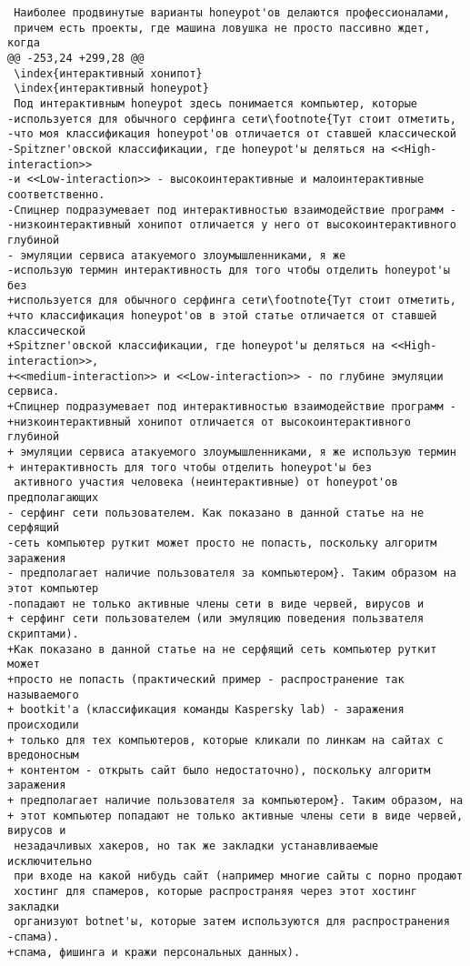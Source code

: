 \begin{verbatim}
 Наиболее продвинутые варианты honeypot'ов делаются профессионалами,
 причем есть проекты, где машина ловушка не просто пассивно ждет, когда
@@ -253,24 +299,28 @@
 \index{интерактивный хонипот}
 \index{интерактивный honeypot}
 Под интерактивным honeypot здесь понимается компьютер, которые
-используется для обычного серфинга сети\footnote{Тут стоит отметить,
-что моя классификация honeypot'ов отличается от ставшей классической
-Spitzner'овской классификации, где honeypot'ы деляться на <<High-interaction>>
-и <<Low-interaction>> - высокоинтерактивные и малоинтерактивные соответственно.
-Спицнер подразумевает под интерактивностью взаимодействие программ -
-низкоинтерактивный хонипот отличается у него от высокоинтерактивного глубиной
- эмуляции сервиса атакуемого злоумышленниками, я же
-использую термин интерактивность для того чтобы отделить honeypot'ы без
+используется для обычного серфинга сети\footnote{Тут стоит отметить,
+что классификация honeypot'ов в этой статье отличается от ставшей классической
+Spitzner'овской классификации, где honeypot'ы деляться на <<High-interaction>>,
+<<medium-interaction>> и <<Low-interaction>> - по глубине эмуляции сервиса.
+Спицнер подразумевает под интерактивностью взаимодействие программ -
+низкоинтерактивный хонипот отличается от высокоинтерактивного глубиной
+ эмуляции сервиса атакуемого злоумышленниками, я же использую термин
+ интерактивность для того чтобы отделить honeypot'ы без
 активного участия человека (неинтерактивные) от honeypot'ов предполагающих
- серфинг сети пользователем. Как показано в данной статье на не серфящий
-сеть компьютер руткит может просто не попасть, поскольку алгоритм заражения
- предполагает наличие пользователя за компьютером}. Таким образом на этот компьютер
-попадают не только активные члены сети в виде червей, вирусов и
+ серфинг сети пользователем (или эмуляцию поведения пользвателя скриптами).
+Как показано в данной статье на не серфящий сеть компьютер руткит может
+просто не попасть (практический пример - распространение так называемого
+ bootkit'а (классификация команды Kaspersky lab) - заражения происходили
+ только для тех компьютеров, которые кликали по линкам на сайтах с вредоносным
+ контентом - открыть сайт было недостаточно), поскольку алгоритм заражения
+ предполагает наличие пользователя за компьютером}. Таким образом, на
+ этот компьютер попадают не только активные члены сети в виде червей, вирусов и
 незадачливых хакеров, но так же закладки устанавливаемые исключительно
 при входе на какой нибудь сайт (например многие сайты с порно продают
 хостинг для спамеров, которые распространяя через этот хостинг закладки
 организуют botnet'ы, которые затем используются для распространения
-спама).
+спама, фишинга и кражи персональных данных).


\end{verbatim}
